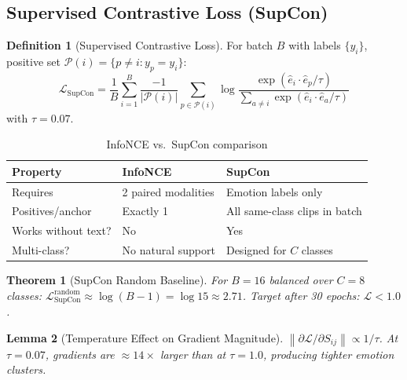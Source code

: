 \documentclass[12pt,a4paper]{article}
\theoremstyle{definition}
\newtheorem{definition}{Definition}[section]
\theoremstyle{plain}
\newtheorem{theorem}{Theorem}[section]
\newtheorem{lemma}[theorem]{Lemma}
\theoremstyle{remark}
\newcommand{\Norm}[1]{\left\|#1\right\|}
\begin{document}
\subsection{Supervised Contrastive Loss (SupCon)}

\begin{definition}[Supervised Contrastive Loss]
For batch $B$ with labels $\{y_i\}$, positive set $\mathcal{P}(i) = \{p \ne i : y_p = y_i\}$:
\[
  \boxed{\mathcal{L}_{\text{SupCon}} = \frac{1}{B}\sum_{i=1}^B \frac{-1}{|\mathcal{P}(i)|}
  \sum_{p \in \mathcal{P}(i)} \log\frac{\exp(\hat{e}_i \cdot \hat{e}_p / \tau)}{\sum_{a \ne i} \exp(\hat{e}_i \cdot \hat{e}_a / \tau)}}
\]
with $\tau = 0.07$.
\end{definition}

\begin{table}[H]
\centering
\caption{InfoNCE vs.\ SupCon comparison}
\renewcommand{\arraystretch}{1.2}
\begin{tabular}{lll}
\toprule
\textbf{Property} & \textbf{InfoNCE} & \textbf{SupCon} \\
\midrule
Requires & 2 paired modalities & Emotion labels only \\
Positives/anchor & Exactly 1 & All same-class clips in batch \\
Works without text? & No & Yes \\
Multi-class? & No natural support & Designed for $C$ classes \\
\bottomrule
\end{tabular}
\end{table}

\begin{theorem}[SupCon Random Baseline]
For $B=16$ balanced over $C=8$ classes: $\mathcal{L}_{\text{SupCon}}^{\text{random}} \approx \log(B-1) = \log 15 \approx 2.71$. Target after 30 epochs: $\mathcal{L} < 1.0$.
\end{theorem}

\begin{lemma}[Temperature Effect on Gradient Magnitude]
$\Norm{\partial\mathcal{L}/\partial S_{ij}} \propto 1/\tau$. At $\tau=0.07$, gradients are $\approx 14\times$ larger than at $\tau=1.0$, producing tighter emotion clusters.
\end{lemma}
\end{document}
